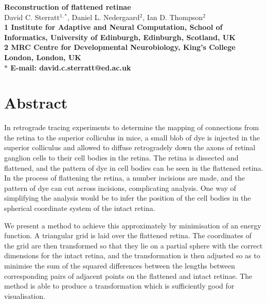 \documentclass[10pt]{article}
\date{}
\begin{document}
\begin{flushleft}
{\Large
\textbf{Reconstruction of flattened retinae}
}
\\
David C. Sterratt$^{1,\ast}$, Daniel L. Nedergaard$^{2}$, Ian
D. Thompson$^{2}$
\\
\bf{1} Institute for Adaptive and Neural Computation, School of
Informatics, University of Edinburgh, Edinburgh, Scotland, UK
\\
\bf{2} MRC Centre for Developmental Neurobiology, King's College
London, London, UK
\\
$\ast$ E-mail: david.c.sterratt@ed.ac.uk
\end{flushleft}

\section*{Abstract}

  In retrograde tracing experiments to determine the mapping of
  connections from the retina to the superior colliculus in mice, a
  small blob of dye is injected in the superior colliculus and allowed
  to diffuse retrogradely down the axons of retinal ganglion cells to
  their cell bodies in the retina. The retina is dissected and
  flattened, and the pattern of dye in cell bodies can be seen in the
  flattened retina.  In the process of flattening the retina, a number
  incisions are made, and the pattern of dye can cut across incisions,
  complicating analysis.  One way of simplifying the analysis would be
  to infer the position of the cell bodies in the spherical coordinate
  system of the intact retina.  

  We present a method to achieve this approximately by minimisation of
  an energy function. A triangular grid is laid over the flattened
  retina. The coordinates of the grid are then transformed so that
  they lie on a partial sphere with the correct dimensions for the
  intact retina, and the transformation is then adjusted so as to
  minimise the sum of the squared differences between the lengths
  between corresponding pairs of adjacent points on the flattened and
  intact retinae.  The method is able to produce a transformation
  which is sufficiently good for visualisation.

\end{document}
